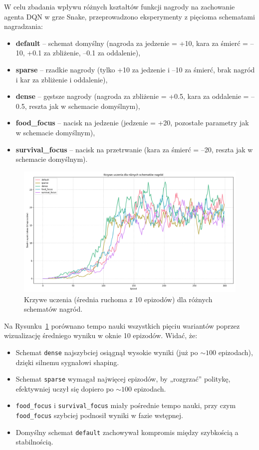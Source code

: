 \documentclass[a4paper,12pt]{article}
\begin{document}
W celu zbadania wpływu różnych kształtów funkcji nagrody na zachowanie agenta DQN w grze Snake, przeprowadzono eksperymenty z pięcioma schematami nagradzania:
\begin{itemize}
  \item \textbf{default} – schemat domyślny (nagroda za jedzenie = +10, kara za śmierć = –10, +0.1 za zbliżenie, –0.1 za oddalenie),
  \item \textbf{sparse} – rzadkie nagrody (tylko +10 za jedzenie i –10 za śmierć, brak nagród i kar za zbliżenie i oddalenie),
  \item \textbf{dense} – gęstsze nagrody (nagroda za zbliżenie = +0.5, kara za oddalenie = –0.5, reszta jak w schemacie domyślnym),
  \item \textbf{food\_focus} – nacisk na jedzenie (jedzenie = +20, pozostałe parametry jak w schemacie domyślnym),
  \item \textbf{survival\_focus} – nacisk na przetrwanie (kara za śmierć = –20, reszta jak w schemacie domyślnym).
\end{itemize}

\begin{figure}[H] 
  \centering
  \includegraphics[width=0.85\linewidth]{krzywe_uczenia.png}
  \caption{Krzywe uczenia (średnia ruchoma z 10 epizodów) dla różnych schematów nagród.}
  \label{fig:reward_curves}
\end{figure}

Na Rysunku~\ref{fig:reward_curves} porównano tempo nauki wszystkich pięciu wariantów poprzez wizualizację średniego wyniku w oknie 10 epizodów. Widać, że:
\begin{itemize}
  \item Schemat \texttt{dense} najszybciej osiągnął wysokie wyniki (już po $\sim100$ epizodach), dzięki silnemu sygnałowi shaping.
  \item Schemat \texttt{sparse} wymagał najwięcej epizodów, by „rozgrzać” politykę, efektywniej uczył się dopiero po $\sim100$ epizodach.
  \item \texttt{food\_focus} i \texttt{survival\_focus} miały pośrednie tempo nauki, przy czym \texttt{food\_focus} szybciej podnosił wyniki w fazie wstępnej.
  \item Domyślny schemat \texttt{default} zachowywał kompromis między szybkością a stabilnością.
\end{itemize}
\end{document}

